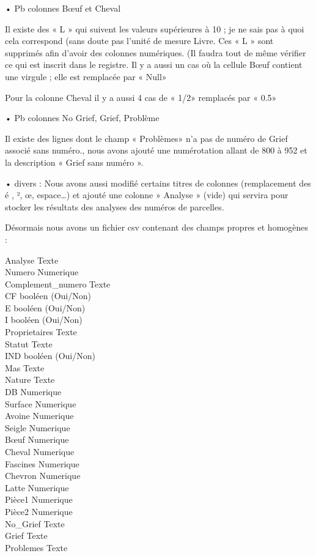 •	Pb colonnes Bœuf et Cheval

Il existe des « L » qui suivent les valeurs supérieures à 10 ; je ne sais pas à quoi cela correspond (sans doute pas l’unité de mesure Livre. Ces « L » sont supprimés afin d’avoir des colonnes numériques. (Il faudra tout de même vérifier ce qui est inscrit dans le registre.
Il y a aussi un cas où la cellule Bœuf contient une virgule ; elle est remplacée par « Null»

Pour la colonne Cheval il y a aussi 4 cas de « 1/2» remplacés par « 0.5»

•	Pb colonnes No Grief, Grief, Problème

Il existe des lignes dont le champ « Problèmes» n’a pas de numéro de Grief associé sans numéro., nous avons ajouté une numérotation allant de 800 à 952 et la description « Grief sans numéro ».

•	divers :
Nous avons aussi modifié certains titres de colonnes (remplacement des é , ², œ, espace…) et ajouté une colonne » Analyse » (vide) qui servira pour stocker les résultats des analyses des numéros de parcelles.

Désormais nous avons un fichier csv contenant des champs propres et homogènes :

Analyse	Texte\\
Numero	Numerique\\
Complement_numero	Texte\\
CF	booléen (Oui/Non)\\
E	booléen (Oui/Non)\\
I	booléen (Oui/Non)\\
Proprietaires	Texte\\
Statut	Texte\\
IND	booléen (Oui/Non)\\
Mas	Texte\\
Nature	Texte\\
DB	Numerique\\
Surface	Numerique\\
Avoine	Numerique\\
Seigle	Numerique\\
Bœuf	Numerique\\
Cheval	Numerique\\
Fascines	Numerique\\
Chevron	Numerique\\
Latte	Numerique\\
Pièce1	Numerique\\
Pièce2	Numerique\\
No_Grief	Texte\\
Grief	Texte\\
Problemes	Texte\\

